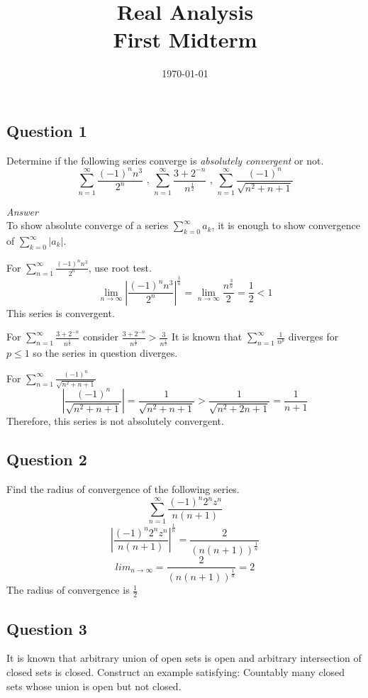 \documentclass{tufte-book}
\title{Real Analysis\\First Midterm }
\author{}
\date{\today}
\theoremstyle{mytheoremstyle}
\theoremstyle{mylemstyle}
\theoremstyle{mydefstyle}
\begin{document}
\maketitle
{}
\newpage
{}

\subsection{Question 1} Determine if the following series converge is \textit{absolutely convergent} or not.
\[ \sum_{n=1}^{\infty} \frac{(-1)^n n^3}{2^n} \text{ , } \sum_{n=1}^{\infty} \frac{3+2^{-n}}{n^{\frac{1}{2}}} \text{ , }  \sum_{n=1}^{\infty} \frac{(-1)^n}{\sqrt{n^2 + n + 1}}\]

\textit{Answer}\\
To show absolute converge of a series $\sum_{k=0}^{\infty}a_k$, it is enough to show convergence of $\sum_{k=0}^{\infty}|a_k|$.

For $\sum_{n=1}^{\infty} \frac{(-1)^n n^3}{2^n}$, use root test.
\[ \lim_{n \to \infty}|\frac{(-1)^n n^3}{2^n}|^\frac{1}{n} = \lim_{n \to \infty} \frac{n^\frac{3}{n}}{2} = \frac{1}{2} < 1 \]
This series is convergent.

For $\sum_{n=1}^{\infty} \frac{3+2^{-n}}{n^{\frac{1}{2}}}$ consider $\frac{3+2^{-n}}{n^{\frac{1}{2}}} > \frac{3}{n^{\frac{1}{2}}}$  It is known that $\sum_{n=1}^{\infty} \frac{1}{n^p}$ diverges for $p \leq 1$ so the series in question diverges.

For $\sum_{n=1}^{\infty} \frac{(-1)^n}{\sqrt{n^2 + n + 1}}$
\[|\frac{(-1)^n}{\sqrt{n^2+n+1}}| = \frac{1}{\sqrt{n^2+n+1}} > \frac{1}{\sqrt{n^2+2n+1}} = \frac{1}{n+1}\]
Therefore, this series is not absolutely convergent.

\subsection{Question 2} Find the radius of convergence of the following series.
\[\sum_{n=1}^{\infty} \frac{(-1)^n2^nz^n}{n(n+1)} \]
\[|\frac{(-1)^n2^nz^n}{n(n+1)}|^\frac{1}{n} = \frac{2}{(n(n+1))^\frac{1}{n}}\]
\[lim_{n \to \infty} =\frac{2}{(n(n+1))^\frac{1}{n}} =2\]
The radius of convergence is $\frac{1}{2}$

\subsection{Question 3} It is known that arbitrary union of open sets is open and arbitrary intersection of closed sets is closed.  Construct an example satisfying: Countably many closed sets whose union is open but not closed.
\end{document}
